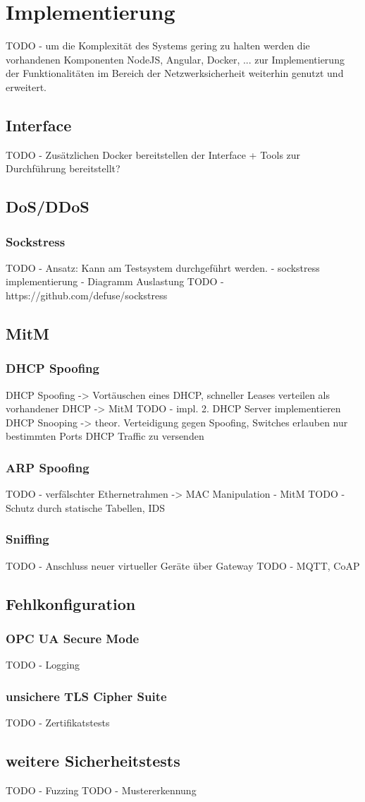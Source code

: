 \chapter{Implementierung}
TODO - um die Komplexität des Systems gering zu halten werden die vorhandenen Komponenten NodeJS, Angular, Docker, ... zur Implementierung der Funktionalitäten im Bereich der Netzwerksicherheit weiterhin genutzt und erweitert.

\section{Interface}
TODO - Zusätzlichen Docker bereitstellen der Interface + Tools zur Durchführung bereitstellt?

\section{\ac{DoS}/\ac{DDoS}}
\subsection{Sockstress}
\label{Impl:Sockstress}
TODO - Ansatz: Kann am Testsystem durchgeführt werden. - sockstress implementierung - Diagramm Auslastung
TODO - https://github.com/defuse/sockstress

\section{\ac{MitM}}
\subsection{\ac{DHCP} Spoofing}
\label{Impl:DHCP Spoofing}
DHCP Spoofing -> Vortäuschen eines DHCP, schneller Leases verteilen als vorhandener DHCP -> MitM
TODO - impl. 2. DHCP Server implementieren
DHCP Snooping -> theor. Verteidigung gegen Spoofing, Switches erlauben nur bestimmten Ports DHCP Traffic zu versenden

\subsection{\ac{ARP} Spoofing}
TODO - verfälschter Ethernetrahmen -> MAC Manipulation - MitM
TODO - Schutz durch statische Tabellen, \ac{IDS}

\subsection{Sniffing}
TODO - Anschluss neuer virtueller Geräte über Gateway
TODO - MQTT, CoAP

\section{Fehlkonfiguration}
\label{Impl:Fehlkonfiguration}
\subsection{OPC UA Secure Mode}
TODO - Logging

\subsection{unsichere TLS Cipher Suite}
TODO - Zertifikatstests

\section{weitere Sicherheitstests}
TODO - Fuzzing
TODO - Mustererkennung